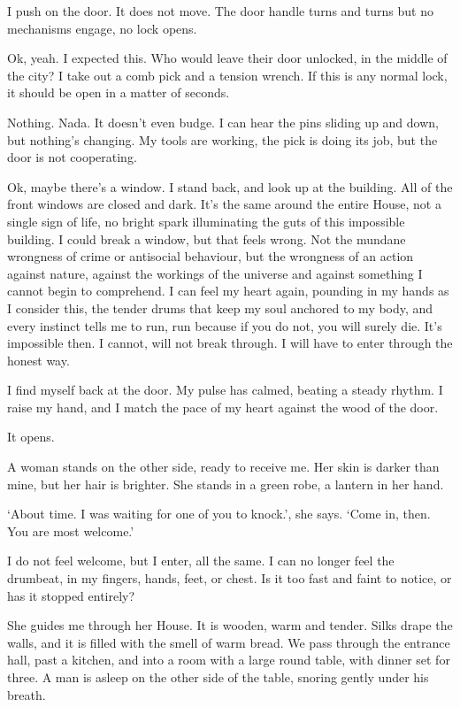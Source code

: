 I push on the door. It does not move. The door handle turns and turns
but no mechanisms engage, no lock opens.

Ok, yeah. I expected this. Who would leave their door unlocked, in the
middle of the city? I take out a comb pick and a tension wrench. If
this is any normal lock, it should be open in a matter of seconds.

Nothing. Nada. It doesn’t even budge. I can hear the pins sliding up
and down, but nothing’s changing. My tools are working, the pick is
doing its job, but the door is not cooperating.

Ok, maybe there’s a window. I stand back, and look up at the
building. All of the front windows are closed and dark. It’s the same
around the entire House, not a single sign of life, no bright spark
illuminating the guts of this impossible building. I could break a
window, but that feels wrong. Not the mundane wrongness of crime or
antisocial behaviour, but the wrongness of an action against nature,
against the workings of the universe and against something I cannot
begin to comprehend. I can feel my heart again, pounding in my hands
as I consider this, the tender drums that keep my soul anchored to my
body, and every instinct tells me to run, run because if you do not,
you will surely die. It’s impossible then. I cannot, will not break
through. I will have to enter through the honest way.

I find myself back at the door. My pulse has calmed, beating a steady
rhythm. I raise my hand, and I match the pace of my heart against the
wood of the door.

It opens.

A woman stands on the other side, ready to receive me. Her skin is
darker than mine, but her hair is brighter. She stands in a green
robe, a lantern in her hand.

`About time. I was waiting for one of you to knock.', she says. `Come
in, then. You are most welcome.'

I do not feel welcome, but I enter, all the same. I can no longer feel
the drumbeat, in my fingers, hands, feet, or chest. Is it too fast and
faint to notice, or has it stopped entirely?

She guides me through her House. It is wooden, warm and tender. Silks
drape the walls, and it is filled with the smell of warm bread. We
pass through the entrance hall, past a kitchen, and into a room with a
large round table, with dinner set for three. A man is asleep on the
other side of the table, snoring gently under his breath.

